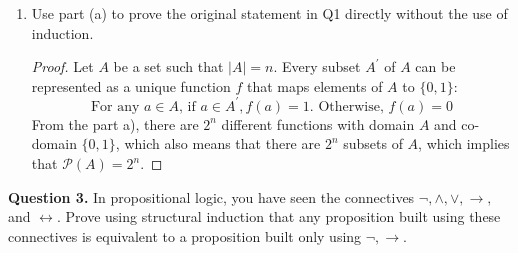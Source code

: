 \documentclass[11pt]{article}
\begin{document}
\begin{enumerate}[label=\alph*)]
\begin{proof}
            By the principle of simple induction, \(P(m)\) is true for all positive naturals \(m\).

            

        \end{proof}

        \item Use part (a) to prove the original statement in Q1 directly without the use of induction.
        \begin{proof}
            Let \(A\) be a set such that \(|A| = n\). Every subset \(A^\prime\) of \(A\) can be represented as a unique function \(f\) that maps elements of \(A\) to \(\{0,1\}\):
            \[
                \text{For any } a \in A \text{, if } a \in A^\prime, f(a) = 1 \text{. Otherwise, } f(a) = 0
            \]
            From the part a), there are \(2^n\) different functions with domain \(A\) and co-domain \(\{0,1\}\), which also means that there are \(2^n\) subsets of \(A\), which implies that \(\mathcal{P} (A)=2^n\).

        \end{proof}
    \end{enumerate}
    \pagebreak
    \noindent\textbf{Question 3.} In propositional logic, you have seen the connectives $\neg, \wedge, \vee, \rightarrow, $ and $\leftrightarrow$. Prove using structural induction that any proposition built using these connectives is equivalent to a proposition built only using $\neg, \rightarrow$.
\end{document}
